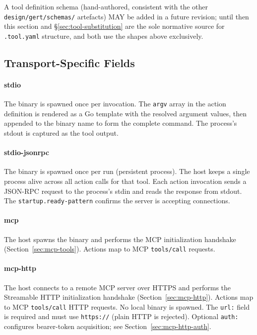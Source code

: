 A tool definition schema (hand-authored, consistent with the other
\texttt{design/gert/schemas/} artefacts) MAY be added in a future revision;
until then this section and \S\ref{sec:tool-substitution} are the sole
normative source for \texttt{.tool.yaml} structure, and both use the shapes
above exclusively.

\subsection{Transport-Specific Fields}

\paragraph{stdio} The binary is spawned once per invocation.  The
\texttt{argv} array in the action definition is rendered as a Go template with
the resolved argument values, then appended to the binary name to form the
complete command.  The process's stdout is captured as the tool output.

\paragraph{stdio-jsonrpc} The binary is spawned once per run (persistent
process).  The host keeps a single process alive across all action calls for
that tool.  Each action invocation sends a JSON-RPC request to the process's
stdin and reads the response from stdout.  The \texttt{startup.ready-pattern}
confirms the server is accepting connections.

\paragraph{mcp} The host spawns the binary and performs the MCP initialization
handshake (Section~\ref{sec:mcp-tools}).  Actions map to MCP \texttt{tools/call}
requests.

\paragraph{mcp-http} The host connects to a remote MCP server over HTTPS and
performs the Streamable HTTP initialization handshake
(Section~\ref{sec:mcp-http}).  Actions map to MCP \texttt{tools/call} HTTP
requests.  No local binary is spawned.  The \texttt{url:} field is required and
must use \texttt{https://} (plain HTTP is rejected).  Optional \texttt{auth:}
configures bearer-token acquisition; see Section~\ref{sec:mcp-http-auth}.


